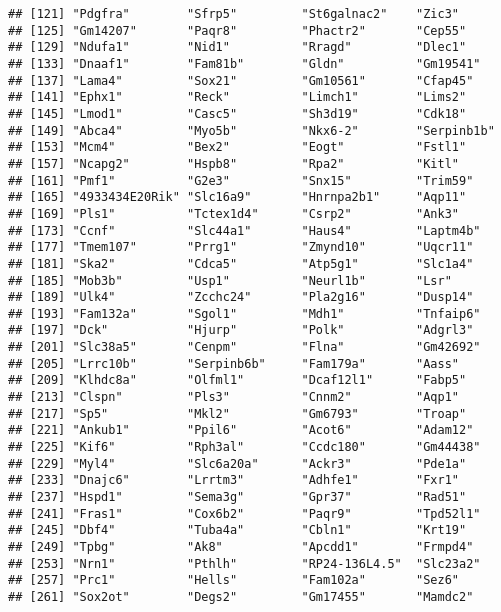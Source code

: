 \documentclass[
]{article}
\begin{document}
\begin{verbatim}
## [121] "Pdgfra"        "Sfrp5"         "St6galnac2"    "Zic3"         
## [125] "Gm14207"       "Paqr8"         "Phactr2"       "Cep55"        
## [129] "Ndufa1"        "Nid1"          "Rragd"         "Dlec1"        
## [133] "Dnaaf1"        "Fam81b"        "Gldn"          "Gm19541"      
## [137] "Lama4"         "Sox21"         "Gm10561"       "Cfap45"       
## [141] "Ephx1"         "Reck"          "Limch1"        "Lims2"        
## [145] "Lmod1"         "Casc5"         "Sh3d19"        "Cdk18"        
## [149] "Abca4"         "Myo5b"         "Nkx6-2"        "Serpinb1b"    
## [153] "Mcm4"          "Bex2"          "Eogt"          "Fstl1"        
## [157] "Ncapg2"        "Hspb8"         "Rpa2"          "Kitl"         
## [161] "Pmf1"          "G2e3"          "Snx15"         "Trim59"       
## [165] "4933434E20Rik" "Slc16a9"       "Hnrnpa2b1"     "Aqp11"        
## [169] "Pls1"          "Tctex1d4"      "Csrp2"         "Ank3"         
## [173] "Ccnf"          "Slc44a1"       "Haus4"         "Laptm4b"      
## [177] "Tmem107"       "Prrg1"         "Zmynd10"       "Uqcr11"       
## [181] "Ska2"          "Cdca5"         "Atp5g1"        "Slc1a4"       
## [185] "Mob3b"         "Usp1"          "Neurl1b"       "Lsr"          
## [189] "Ulk4"          "Zcchc24"       "Pla2g16"       "Dusp14"       
## [193] "Fam132a"       "Sgol1"         "Mdh1"          "Tnfaip6"      
## [197] "Dck"           "Hjurp"         "Polk"          "Adgrl3"       
## [201] "Slc38a5"       "Cenpm"         "Flna"          "Gm42692"      
## [205] "Lrrc10b"       "Serpinb6b"     "Fam179a"       "Aass"         
## [209] "Klhdc8a"       "Olfml1"        "Dcaf12l1"      "Fabp5"        
## [213] "Clspn"         "Pls3"          "Cnnm2"         "Aqp1"         
## [217] "Sp5"           "Mkl2"          "Gm6793"        "Troap"        
## [221] "Ankub1"        "Ppil6"         "Acot6"         "Adam12"       
## [225] "Kif6"          "Rph3al"        "Ccdc180"       "Gm44438"      
## [229] "Myl4"          "Slc6a20a"      "Ackr3"         "Pde1a"        
## [233] "Dnajc6"        "Lrrtm3"        "Adhfe1"        "Fxr1"         
## [237] "Hspd1"         "Sema3g"        "Gpr37"         "Rad51"        
## [241] "Fras1"         "Cox6b2"        "Paqr9"         "Tpd52l1"      
## [245] "Dbf4"          "Tuba4a"        "Cbln1"         "Krt19"        
## [249] "Tpbg"          "Ak8"           "Apcdd1"        "Frmpd4"       
## [253] "Nrn1"          "Pthlh"         "RP24-136L4.5"  "Slc23a2"      
## [257] "Prc1"          "Hells"         "Fam102a"       "Sez6"         
## [261] "Sox2ot"        "Degs2"         "Gm17455"       "Mamdc2"       

\end{verbatim}
\end{document}
